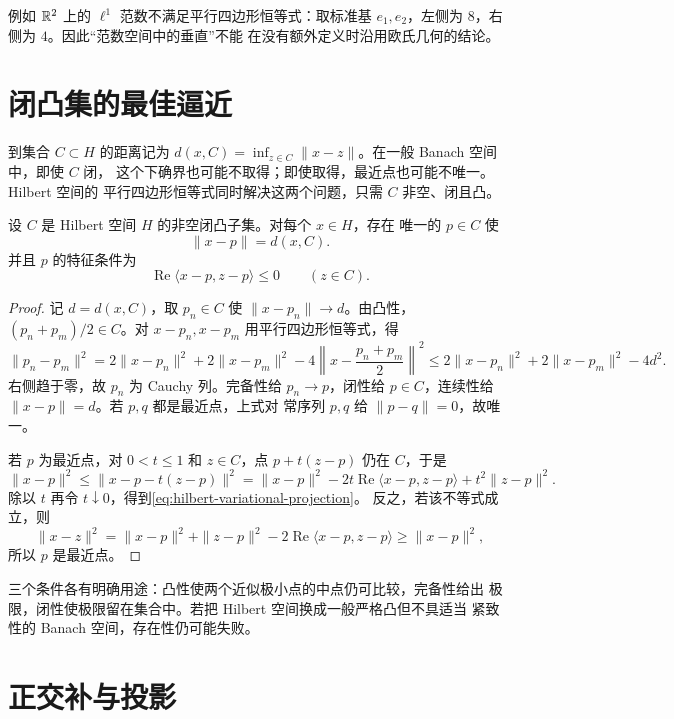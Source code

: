 例如 \(\mathbb{R}^2\) 上的 \(\ell^1\) 范数不满足平行四边形恒等式：取标准基
\(e_1,e_2\)，左侧为 \(8\)，右侧为 \(4\)。因此“范数空间中的垂直”不能
在没有额外定义时沿用欧氏几何的结论。

\section{闭凸集的最佳逼近}

到集合 \(C\subset H\) 的距离记为
\(d(x,C)=\inf_{z\in C}\|x-z\|\)。在一般 Banach 空间中，即使 \(C\) 闭，
这个下确界也可能不取得；即使取得，最近点也可能不唯一。Hilbert 空间的
平行四边形恒等式同时解决这两个问题，只需 \(C\) 非空、闭且凸。

\begin{theorem}[最佳逼近定理]\label{thm:hilbert-best-approximation}
设 \(C\) 是 Hilbert 空间 \(H\) 的非空闭凸子集。对每个 \(x\in H\)，存在
唯一的 \(p\in C\) 使
\[
 \|x-p\|=d(x,C).
\]
并且 \(p\) 的特征条件为
\begin{equation}\label{eq:hilbert-variational-projection}
 \operatorname{Re}\langle x-p,z-p\rangle\le0\qquad(z\in C).
\end{equation}
\end{theorem}
\begin{proof}
记 \(d=d(x,C)\)，取 \(p_n\in C\) 使 \(\|x-p_n\|\to d\)。由凸性，
\((p_n+p_m)/2\in C\)。对 \(x-p_n,x-p_m\) 用平行四边形恒等式，得
\[
 \|p_n-p_m\|^2
 =2\|x-p_n\|^2+2\|x-p_m\|^2
   -4\left\|x-\frac{p_n+p_m}{2}\right\|^2
 \le2\|x-p_n\|^2+2\|x-p_m\|^2-4d^2.
\]
右侧趋于零，故 \(p_n\) 为 Cauchy 列。完备性给 \(p_n\to p\)，闭性给
\(p\in C\)，连续性给 \(\|x-p\|=d\)。若 \(p,q\) 都是最近点，上式对
常序列 \(p,q\) 给 \(\|p-q\|=0\)，故唯一。

若 \(p\) 为最近点，对 \(0<t\le1\) 和 \(z\in C\)，点
\(p+t(z-p)\) 仍在 \(C\)，于是
\[
 \|x-p\|^2\le\|x-p-t(z-p)\|^2
 =\|x-p\|^2-2t\operatorname{Re}\langle x-p,z-p\rangle
   +t^2\|z-p\|^2.
\]
除以 \(t\) 再令 \(t\downarrow0\)，得到\eqref{eq:hilbert-variational-projection}。
反之，若该不等式成立，则
\[
 \|x-z\|^2=\|x-p\|^2+\|z-p\|^2
 -2\operatorname{Re}\langle x-p,z-p\rangle\ge\|x-p\|^2,
\]
所以 \(p\) 是最近点。
\end{proof}

三个条件各有明确用途：凸性使两个近似极小点的中点仍可比较，完备性给出
极限，闭性使极限留在集合中。若把 Hilbert 空间换成一般严格凸但不具适当
紧致性的 Banach 空间，存在性仍可能失败。

\section{正交补与投影}

